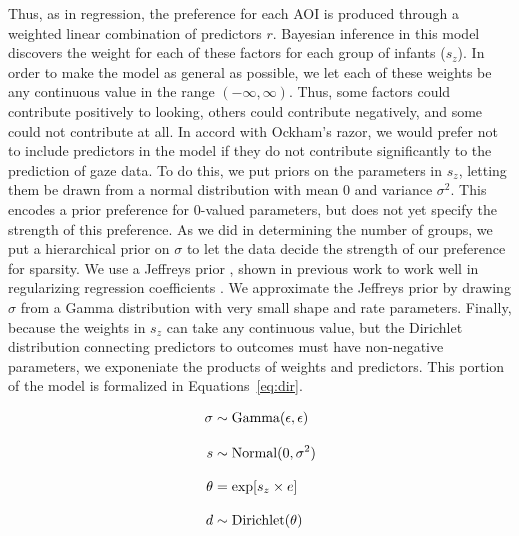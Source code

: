 \documentclass[12pt]{article}
\begin{document}
	Thus, as in regression, the preference for each AOI is produced through a weighted linear combination of predictors $r$. Bayesian inference in this model discovers the weight for each of these factors for each group of infants ($s_{z}$). In order to make the model as general as possible, we let each of these weights be any continuous value in the range $(-\infty,\infty)$. Thus, some factors could contribute positively to looking, others could contribute negatively, and some could not contribute at all. In accord with Ockham’s razor, we would prefer not to include predictors in the model if they do not contribute significantly to the prediction of gaze data. To do this, we put priors on the parameters in $s_{z}$, letting them be drawn from a normal distribution with mean 0 and variance $\sigma^{2}$. This encodes a prior preference for 0-valued parameters, but does not yet specify the strength of this preference. As we did in determining the number of groups, we put a hierarchical prior on $\sigma$ to let the data decide the strength of our preference for sparsity. We use a Jeffreys prior \cite{Jeffreys1961}, shown in previous work to work well in regularizing regression coefficients \cite{Figuerido2002}. We approximate the Jeffreys prior by drawing $\sigma$ from a Gamma distribution with very small shape and rate parameters. Finally, because the weights in $s_{z}$  can take any continuous value, but the Dirichlet distribution connecting predictors to outcomes must have non-negative parameters, we exponeniate the products of weights and predictors. This portion of the model is formalized in Equations~\ref{eq:dir}.

\begin{equation}\label{eq:dir}
\setlength{\jot}{12pt}
\begin{aligned} 
\sigma &\sim \text{Gamma}(\epsilon, \epsilon)\\
s &\sim \text{Normal}(0, \sigma^{2})\\
\theta &= \text{exp}[s_{z} \times e]\\
d &\sim \text{Dirichlet}(\theta)
\end{aligned}
\end{equation}



\clearpage
\end{document}
